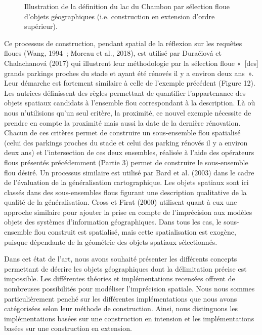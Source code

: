 \begin{figure}
  \centering
  \caption{Illustration de la définition du lac du Chambon par
    sélection floue d’objets géographiques (i.e. construction en
    extension d’ordre supérieur).}
  \label{fig:champ_raster_sel}
\end{figure}

Ce processus de construction, pendant spatial de la réflexion sur les
requêtes floues (Wang, 1994 ; Moreau et al., 2018), est utilisé par
Duračiová et Chalachanová (2017) qui illustrent leur méthodologie par
la sélection floue « [des] grands parkings proches du stade et ayant
été rénovés il y a environ deux ans ». Leur démarche est fortement
similaire à celle de l’exemple précédent (Figure 12). Les autrices
définissent des règles permettant de quantifier l’appartenance des
objets spatiaux candidats à l’ensemble flou correspondant à la
description. Là où nous n’utilisions qu’un seul critère, la proximité,
ce nouvel exemple nécessite de prendre en compte la proximité mais
aussi la date de la dernière rénovation. Chacun de ces critères permet
de construire un sous-ensemble flou spatialisé (celui des parkings
proches du stade et celui des parking rénovés il y a environ deux ans)
et l’intersection de ces deux ensembles, réalisée à l’aide des
opérateurs flous présentés précédemment (Partie 3) permet de
construire le sous-ensemble flou désiré. Un processus similaire est
utilisé par Bard et al. (2003) dans le cadre de l’évaluation de la
généralisation cartographique. Les objets spatiaux sont ici classés
dans des sous-ensembles flous figurant une description qualitative de
la qualité de la généralisation. Cross et Firat (2000) utilisent quant
à eux une approche similaire pour ajouter la prise en compte de
l’imprécision aux modèles objets des systèmes d’information
géographiques. Dans tous les cas, le sous-ensemble flou construit est
spatialisé, mais cette spatialisation est exogène, puisque dépendante
de la géométrie des objets spatiaux sélectionnés.


Dans cet état de l’art, nous avons souhaité présenter les différents
concepts permettant de décrire les objets géographiques dont la
délimitation précise est impossible. Les différentes théories et
implémentations recensées offrent de nombreuses possibilités pour
modéliser l’imprécision spatiale. Nous nous sommes particulièrement
penché sur les différentes implémentations que nous avons catégorisées
selon leur méthode de construction. Ainsi, nous distinguons les
implémentations basées sur une construction en intension et les
implémentations basées sur une construction en extension.

